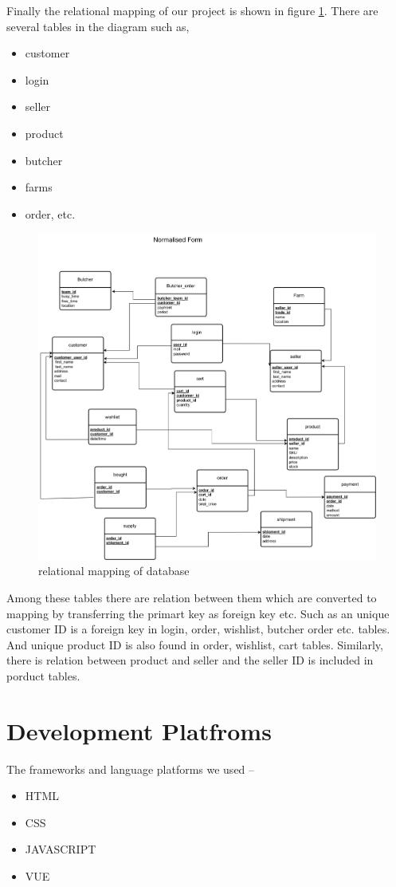 \documentclass[a4paper,12pt]{report}
\begin{document}
Finally the relational mapping of our project is shown in figure \ref{mapping}. There are several tables in the diagram such as, 
\begin{itemize}
	\item customer
	\item login
	\item seller
	\item product
	\item butcher
	\item farms
	\item order, etc.
\end{itemize}
\begin{figure}
	\includegraphics[keepaspectratio, width=\linewidth]{smartHattdbmapping.png}
	\caption{relational mapping of database}
	\label{mapping}
\end{figure}
 Among these tables there are relation between them which are converted to mapping by transferring the primart key as foreign key etc. Such as an unique customer ID is a foreign key in login, order, wishlist, butcher order etc. tables. And unique product ID is also found in order, wishlist, cart tables. Similarly, there is relation between product and seller and the seller ID is included in porduct tables.

\section*{Development Platfroms}
The frameworks and language platforms we used --
\begin{itemize}
	\item HTML
	\item CSS
	\item JAVASCRIPT
	\item VUE
\end{itemize}
\end{document}

